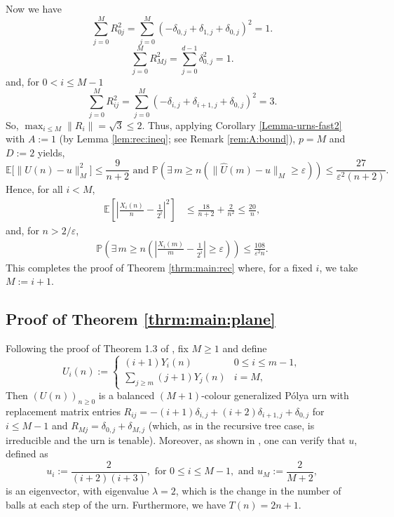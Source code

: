 \documentclass[12pt]{amsart}
\theoremstyle{definition}
\theoremstyle{remark}
\newcommand{\norm}[1]{\left\lVert#1\right\rVert}
\newcommand{\PP}{\mathbb{P}}
\newcommand{\EE}{\mathbb{E}}
\begin{document}
Now we have 
   \[
   \sum_{j=0}^{M} R_{0j}^2= \sum_{j=0}^{M} (-\delta_{0,j} + \delta_{1,j} + \delta_{0,j})^2= 1.
   \]
    \[
   \sum_{j=0}^{M} R_{Mj}^2= \sum_{j=0}^{d-1} \delta_{0,j}^2= 1.
   \]
and, for $0 < i \le M-1$
  \[
   \sum_{j=0}^{M} R_{ij}^2= \sum_{j=0}^{M} (-\delta_{i,j} + \delta_{i+1,j} + \delta_{0,j})^2= 3.
   \]
So, $\max_{i\le M} \norm{R_i}=\sqrt{3}\leq 2$. Thus, applying Corollary \ref{Lemma-urns-fast2} with $A :=1$ (by Lemma \ref{lem:rec:ineq}; see Remark \ref{rem:A:bound}), $p=M$ and $D:=2$ yields,
\[
\EE\bigl[\|\hat{U}(n) - u\|_M^2\bigr] \leq \frac{9}{n+2}
 \text{ and } 
\PP\left(\exists\, m \geq n \left(\|\hat{U}(m) - u\|_M \geq \varepsilon\right)\right) 
\leq  \frac{27}{\varepsilon^2(n+2)}.
\]
Hence, for all $i < M$,
\begin{align*}
    \EE\left[\left|\frac{X_i(n)}{n} - \frac{1}{2^i}\right|^2\right]
    &\leq \frac{18}{n+2} + \frac{2}{n^2}\le \frac{20}{n},
\end{align*}
and, for $n > 2/\varepsilon$,
\begin{align*}
  \PP\left(\exists\, m \geq n \left(\left|\frac{X_i(m)}{m} 
  - \frac{1}{2^i}\right| \geq \varepsilon\right)\right) 
  \leq \frac{108}{\varepsilon^2n}.
\end{align*}
This completes the proof of Theorem \ref{thrm:main:rec} where, for a fixed $i$, we take $M:=i+1$.

\subsection{Proof of Theorem \ref{thrm:main:plane}}
Following the proof of Theorem 1.3 of \cite{janson2005asymptotic}, fix $M \geq 1$ 
and define
\[
U_i(n) := \begin{cases}(i+1) Y_i(n) & 0 \leq i \leq m-1, \\ \displaystyle\sum_{j \geq m}(j+1) Y_j(n) & i = M, \end{cases}
\]
Then  $(U(n))_{n \geq 0}$ is a 
balanced $(M+1)$-colour generalized P\'{o}lya urn with replacement matrix entries
$R_{ij} = -(i+1)\delta_{i,j} +(i+2)\delta_{i+1,j}+\delta_{0,j}$ for $i \leq M-1$ 
and $R_{Mj}=\delta_{0,j}+\delta_{M,j}$ (which, as in the recursive tree case, is irreducible and the urn is tenable). Moreover, as shown in \cite{janson2005asymptotic}, one can verify that $u$, defined as 
 \[
u_i := \frac{2}{(i+2)(i+3)},\mbox{ for }  0 \leq i \leq M-1,\mbox{ and } u_M := \frac{2}{M+2},
\]
is an eigenvector, with eigenvalue $\lambda = 2$, which is the change in the number of balls at each step of the urn. Furthermore, we have $T(n)=2n+1$.\\
\end{document}
